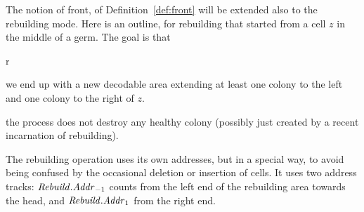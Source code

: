 \documentclass[11pt]{memoir}
\theoremstyle{definition} %
\newcommand{\fld}[1]{\ensuremath{\textit{#1\/}}}
\newcommand{\Addr}{\fld{Addr}}
\newcommand{\Rebuild}{\fld{Rebuild}} %
\begin{document}
The notion of front, of Definition~\ref{def:front} will be extended also to the rebuilding mode.
Here is an outline, for rebuilding that started from a cell \( z \) in the middle
of a germ.
The goal is that
\begin{varenum}{r}
\item\label{i:rebuild-size} we end up with a new decodable area
  extending at least one colony to the left and one colony to the right of \( z \).
\item\label{i:keep-healthy} the process does not destroy any healthy colony
  (possibly just created by a recent incarnation of rebuilding).
\end{varenum}

The rebuilding operation uses its own addresses, but in a special way, to avoid being
confused by the occasional deletion or insertion of cells.
It uses two address tracks: 
\( \Rebuild.\Addr_{-1} \) counts from the left end of the rebuilding area towards the head,
and \( \Rebuild.\Addr_{1} \) from the right end.

\end{document}
